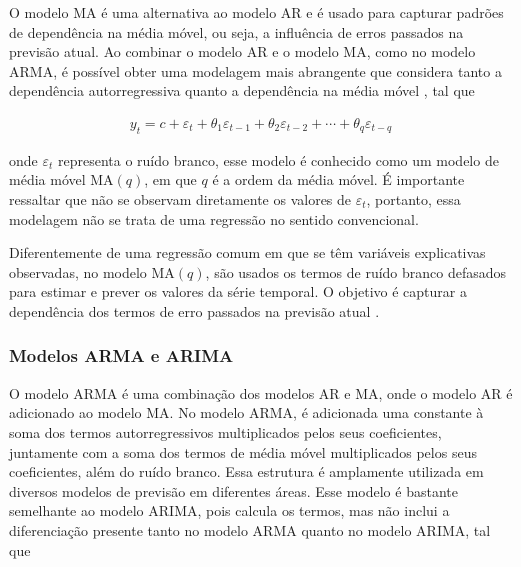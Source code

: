 O modelo MA é uma alternativa ao modelo AR e é usado para capturar padrões de dependência na média móvel, ou seja, a influência de erros passados na previsão atual. Ao combinar o modelo AR e o modelo MA, como no modelo ARMA, é possível obter uma modelagem mais abrangente que considera tanto a dependência autorregressiva quanto a dependência na média móvel \cite{arima}, tal que



\begin{eqnarray}
	y_t=c+\varepsilon_t+\theta_1 \varepsilon_{t-1}+\theta_2 \varepsilon_{t-2}+\cdots+\theta_q \varepsilon_{t-q}\label{eq:ma}
\end{eqnarray}

\noindent onde $\varepsilon_t$ representa o ruído branco, esse modelo é conhecido como um modelo de média móvel MA$(q)$, em que $q$ é a ordem da média móvel. É importante ressaltar que não se observam diretamente os valores de $\varepsilon_t$, portanto, essa modelagem não se trata de uma regressão no sentido convencional.

Diferentemente de uma regressão comum em que se têm variáveis explicativas observadas, no modelo MA$(q)$, são usados os termos de ruído branco defasados para estimar e prever os valores da série temporal. O objetivo é capturar a dependência dos termos de erro passados na previsão atual \cite{arima}.

%


\subsubsection{Modelos ARMA e ARIMA}\label{subsubsec:arma}

O modelo ARMA é uma combinação dos modelos AR  e MA, onde o modelo AR é adicionado ao modelo MA.
No modelo ARMA, é adicionada uma constante à soma dos termos autorregressivos multiplicados pelos seus coeficientes, juntamente com a soma dos termos de média móvel multiplicados pelos seus coeficientes, além do ruído branco. Essa estrutura é amplamente utilizada em diversos modelos de previsão em diferentes áreas.
Esse modelo é bastante semelhante ao modelo ARIMA, pois calcula os termos, mas não inclui a diferenciação presente tanto no modelo ARMA quanto no modelo ARIMA, tal que

